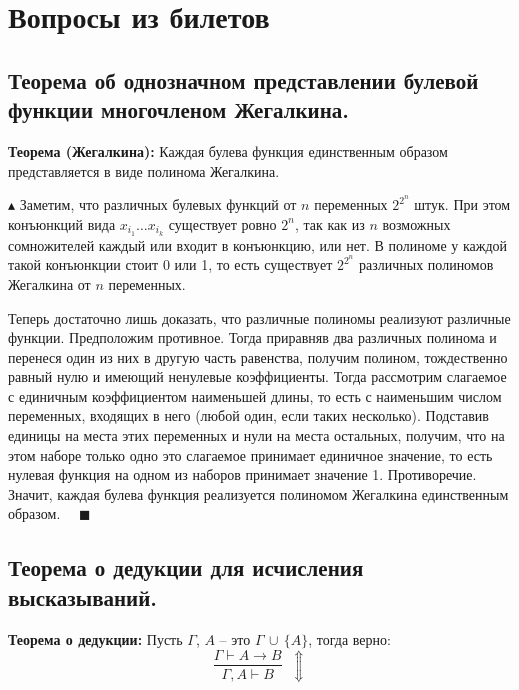 \section{Вопросы из билетов}

\subsection{Теорема об однозначном представлении булевой функции многочленом Жегалкина.}
\textbf{Теорема (Жегалкина):} Каждая булева функция единственным образом представляется в виде полинома Жегалкина.

$\blacktriangle$ Заметим, что различных булевых функций от $n$ переменных $2^{2^n}$ штук. При этом конъюнкций вида $x_{i_1}\ldots x_{i_k}$ существует ровно $2^n$, так как из $n$ возможных сомножителей каждый или входит в конъюнкцию, или нет. В полиноме у каждой такой конъюнкции стоит 0 или 1, то есть существует $2^{2^n}$ различных полиномов Жегалкина от $n$ переменных.

Теперь достаточно лишь доказать, что различные полиномы реализуют различные функции. Предположим противное. Тогда приравняв два различных полинома и перенеся один из них в другую часть равенства, получим полином, тождественно равный нулю и имеющий ненулевые коэффициенты. Тогда рассмотрим слагаемое с единичным коэффициентом наименьшей длины, то есть с наименьшим числом переменных, входящих в него (любой один, если таких несколько). Подставив единицы на места этих переменных и нули на места остальных, получим, что на этом наборе только одно это слагаемое принимает единичное значение, то есть нулевая функция на одном из наборов принимает значение 1. Противоречие. Значит, каждая булева функция реализуется полиномом Жегалкина единственным образом. $\quad \blacksquare$ 

\subsection{Теорема о дедукции для исчисления высказываний.}

\textbf{Теорема о дедукции:} Пусть $\Gamma$, $A$ -- это $\Gamma \,\cup\, \{A\}$, тогда верно:
$$\frac{\Gamma\vdash A\to B}{\Gamma,A\vdash B}\;\;\Updownarrow$$

